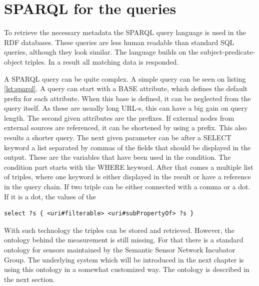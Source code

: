 \section{SPARQL for the queries}

To retrieve the necessary metadata the SPARQL query language is used in the RDF databases. These queries are less human readable than standard SQL queries, although they look similar. The language builds on the subject-predicate-object triples. In a result all matching data is responded. 


A SPARQL query can be quite complex. A simple query can be seen on listing \ref{lst:sparql}. A query can start with a BASE attribute, which defines the default prefix for each attribute. When this base is defined, it can be neglected from the query itself. As these are usually long URL-s, this can have a big gain on query length. The second given attributes are the prefixes. If external nodes from external sources are referenced, it can be shortened by using a prefix. This also results a shorter query. The next given parameter can be after a SELECT keyword a list separated by commas of the fields that should be displayed in the output. These are the variables that have been used in the condition. 
The condition part starts with the WHERE keyword. After that comes a multiple list of triples, where one keyword is either displayed in the result or have a reference in the query chain. If two triple can be either connected with a comma or a dot. If it is a dot, the values of the 

\begin{lstlisting}[caption={Sample SPARQL that queries all filterable objects\label{lst:sparql}}]
select ?s { <uri#filterable> <uri#subPropertyOf> ?s }
\end{lstlisting}

With such technology the triples can be stored and retrieved. However, the ontology behind the measurement is still missing. For that there is a standard ontology for sensors maintained by the Semantic Sensor Network Incubator Group. The underlying system which will be introduced in the next chapter is using this ontology in a somewhat customized way\cite{g2d2}.  The ontology is described in the next section.

